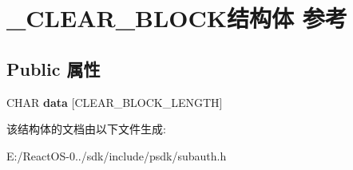 \hypertarget{struct___c_l_e_a_r___b_l_o_c_k}{}\section{\+\_\+\+C\+L\+E\+A\+R\+\_\+\+B\+L\+O\+C\+K结构体 参考}
\label{struct___c_l_e_a_r___b_l_o_c_k}
\subsection*{Public 属性}
\begin{DoxyCompactItemize}
\item 
\mbox{\label{struct___c_l_e_a_r___b_l_o_c_k_a957c0093e0a53285d75af06c68b77533}} 
C\+H\+AR {\bfseries data} \mbox{[}C\+L\+E\+A\+R\+\_\+\+B\+L\+O\+C\+K\+\_\+\+L\+E\+N\+G\+TH\mbox{]}
\end{DoxyCompactItemize}


该结构体的文档由以下文件生成\+:\begin{DoxyCompactItemize}
\item 
E\+:/\+React\+O\+S-\/0../sdk/include/psdk/subauth.\+h\end{DoxyCompactItemize}
